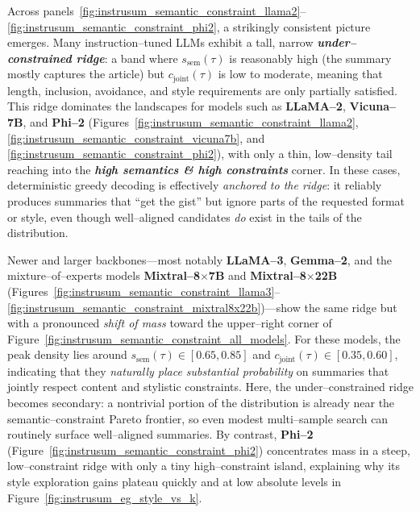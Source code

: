 Across panels~\ref{fig:instrusum_semantic_constraint_llama2}--%
\ref{fig:instrusum_semantic_constraint_phi2}, a strikingly consistent
picture emerges.  Many instruction--tuned LLMs exhibit a tall, narrow
\emph{\textbf{under--constrained ridge}}: a band where
$s_{\text{sem}}(\tau)$ is reasonably high (the summary mostly captures
the article) but $c_{\text{joint}}(\tau)$ is low to moderate, meaning
that length, inclusion, avoidance, and style requirements are only
partially satisfied.  This ridge dominates the landscapes for models
such as \textbf{LLaMA--2}, \textbf{Vicuna--7B}, and \textbf{Phi--2}
(Figures~\ref{fig:instrusum_semantic_constraint_llama2},
\ref{fig:instrusum_semantic_constraint_vicuna7b}, and
\ref{fig:instrusum_semantic_constraint_phi2}), with only a thin,
low--density tail reaching into the
\emph{\textbf{high semantics \& high constraints}} corner.  In these
cases, deterministic greedy decoding is effectively \emph{anchored to
the ridge}: it reliably produces summaries that ``get the gist'' but
ignore parts of the requested format or style, even though well--aligned
candidates \emph{do} exist in the tails of the distribution.

Newer and larger backbones---most notably \textbf{LLaMA--3},
\textbf{Gemma--2}, and the mixture--of--experts models
\textbf{Mixtral--8$\times$7B} and \textbf{Mixtral--8$\times$22B}
(Figures~\ref{fig:instrusum_semantic_constraint_llama3}--%
\ref{fig:instrusum_semantic_constraint_mixtral8x22b})---show the same
ridge but with a pronounced \emph{shift of mass} toward the upper--right
corner of Figure~\ref{fig:instrusum_semantic_constraint_all_models}.
For these models, the peak density lies around
$s_{\text{sem}}(\tau) \in [0.65,0.85]$ and
$c_{\text{joint}}(\tau) \in [0.35,0.60]$, indicating that they
\emph{naturally place substantial probability} on summaries that jointly
respect content and stylistic constraints.  Here, the under--constrained
ridge becomes secondary: a nontrivial portion of the distribution is
already near the semantic--constraint Pareto frontier, so even modest
multi--sample search can routinely surface well--aligned summaries.
By contrast, \textbf{Phi--2}
(Figure~\ref{fig:instrusum_semantic_constraint_phi2}) concentrates mass
in a steep, low--constraint ridge with only a tiny high--constraint
island, explaining why its style exploration gains plateau quickly and
at low absolute levels in Figure~\ref{fig:instrusum_eg_style_vs_k}.

